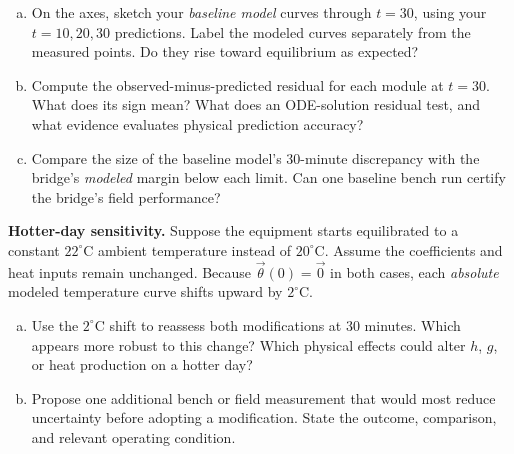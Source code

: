 \documentclass[10pt,letterpaper]{article}
\newcommand{\work}[1]{\vspace{#1}}
\begin{document}
\begin{center}
\end{center}

\begin{enumerate}[a.,leftmargin=*]
\item On the axes, sketch your \emph{baseline model} curves through $t=30$, using your $t=10,20,30$ predictions. Label the modeled curves separately from the measured points. Do they rise toward equilibrium as expected?\work{0.16in}
\item Compute the observed-minus-predicted residual for each module at $t=30$. What does its sign mean? What does an ODE-solution residual test, and what evidence evaluates physical prediction accuracy?\work{0.49in}
\item Compare the size of the baseline model's 30-minute discrepancy with the bridge's \emph{modeled} margin below each limit. Can one baseline bench run certify the bridge's field performance?\work{0.48in}
\end{enumerate}

\textbf{Hotter-day sensitivity.} Suppose the equipment starts equilibrated to a constant $22^\circ$C ambient temperature instead of $20^\circ$C. Assume the coefficients and heat inputs remain unchanged. Because $\vec\theta(0)=\vec0$ in both cases, each \emph{absolute} modeled temperature curve shifts upward by $2^\circ$C.
\begin{enumerate}[d.,leftmargin=*]
\item Use the $2^\circ$C shift to reassess both modifications at 30 minutes. Which appears more robust to this change? Which physical effects could alter $h$, $g$, or heat production on a hotter day?\work{0.45in}
\item Propose one additional bench or field measurement that would most reduce uncertainty before adopting a modification. State the outcome, comparison, and relevant operating condition.\work{0.42in}
\end{enumerate}
\end{document}
